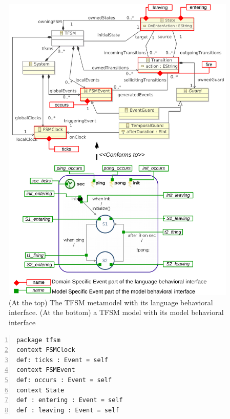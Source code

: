 \begin{figure}
	\begin{center}
		\includegraphics[width=1\textwidth]{appendix/figs/tfsmlang}
		\caption{(At the top) The TFSM metamodel with its language behavioral interface. (At the bottom)  a TFSM model with its model behavioral interface}
		\label{fig:tfsmmm}
	\end{center}
\end{figure}

\begin{lstlisting}[language=ecl,
caption={Partial \ecl specification of TFSM},
label={fig:tfsmmmecl}, 
basicstyle=\scriptsize\ttfamily, backgroundcolor=\color{LGrey}, numbers=left, xleftmargin=3pt]
package tfsm
context FSMClock
def: ticks : Event = self
context FSMEvent
def: occurs : Event = self
context State
def : entering : Event = self
def : leaving : Event = self
\end{lstlisting}


